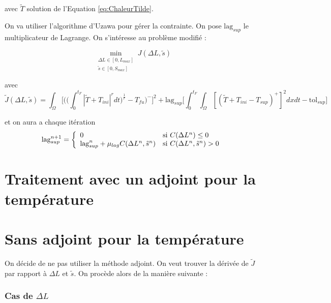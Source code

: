 \documentclass[11pt,a4paper]{article}
\begin{document}
avec $\tilde T$ solution de l'Equation \ref{eq:ChaleurTilde}.

\vspace{0cm}

On va utiliser l'algorithme d'Uzawa pour gérer la contrainte. On pose $\textrm{lag}_{sup}$ le multiplicateur de Lagrange. On s'intéresse au problème modifié :

\begin{equation}
\min_{\begin{array}{l}
	\Delta L\in[0,L_{max}] \\
	\tilde{s}\in [0,S_{max}]
	\end{array}} J(\Delta L,\tilde{s})
\end{equation}

avec 
\begin{equation}
\tilde{J}(\Delta L,\tilde{s})=\int_{\Omega}\Bigg[\Bigg(\Big(\int_{0}^{t_F}|\tilde{T}+T_{ini}|^rdt\Big)^{\frac{1}{r}}-T_{fu}\Bigg)^-\Bigg]^2+\textrm{lag}_{sup} \Bigg[\int_{0}^{t_F}\int_{\Omega}[(\tilde{T}+T_{ini}-T_{sup})^+]^2dxdt-\textrm{tol}_{sup}\Bigg]
\end{equation}

et on aura a chaque itération 
\begin{equation}
\textrm{lag}_{sup}^{n+1}=\left\{
\begin{array}{ll}
0 & \textrm{si\,\,}C(\Delta L^n)\leq0 \\
\textrm{lag}_{sup}^n+\mu_{lag}C(\Delta L^n,\tilde{s}^n) & \textrm{si\,\,}C(\Delta L^n,\tilde{s}^n)>0
\end{array}
\right.
\end{equation}





\section*{Traitement avec un adjoint pour la température}



\section*{Sans adjoint pour la température}


On décide de ne pas utiliser la méthode adjoint. On veut trouver la dérivée de $\tilde{J}$ par rapport à $\Delta L$ et $\tilde{s}$. On procède alors de la manière suivante :

\subsubsection*{Cas de $\Delta L$}
\end{document}
